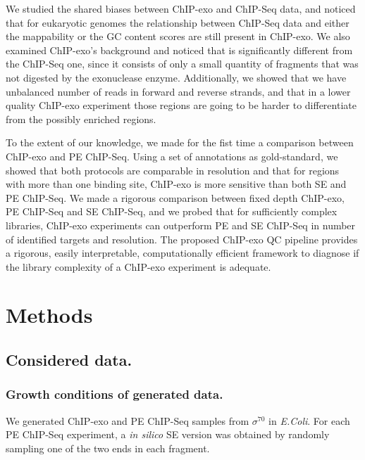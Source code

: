 \documentclass{bmcart}\usepackage[]{graphicx}\usepackage[]{color}
\newcommand{\sig}{\sigma^{70}}
\begin{document}
We studied the shared biases between ChIP-exo and ChIP-Seq data, and
noticed that for eukaryotic genomes the relationship between ChIP-Seq
data and either the mappability or the GC content scores are still
present in ChIP-exo. We also examined ChIP-exo's background and
noticed that is significantly different from the ChIP-Seq one, since
it consists of only a small quantity of fragments that was not
digested by the exonuclease enzyme. Additionally, we showed that we
have unbalanced number of reads in forward and reverse strands, and
that in a lower quality ChIP-exo experiment those regions are going to
be harder to differentiate from the possibly enriched regions.

To the extent of our knowledge, we made for the fist time a comparison
between ChIP-exo and PE ChIP-Seq. Using a set of annotations as
gold-standard, we showed that both protocols are comparable in
resolution and that for regions with more than one binding site,
ChIP-exo is more sensitive than both SE and PE ChIP-Seq. We made a
rigorous comparison between fixed depth ChIP-exo, PE ChIP-Seq and SE
ChIP-Seq, and we probed that for sufficiently complex libraries,
ChIP-exo experiments can outperform PE and SE ChIP-Seq in number of
identified targets and resolution. The proposed ChIP-exo QC pipeline
provides a rigorous, easily interpretable, computationally efficient
framework to diagnose if the library complexity of a ChIP-exo
experiment is adequate.

\section*{Methods}
\label{sec:methods}



\subsection*{Considered data.}


\subsubsection*{Growth conditions of generated data.}

We generated ChIP-exo and PE ChIP-Seq samples from $\sig$ in
\emph{E.Coli}. For each PE ChIP-Seq experiment, a \emph{in silico} SE
version was obtained by randomly sampling one of the two ends in each
fragment. 
\end{document}
